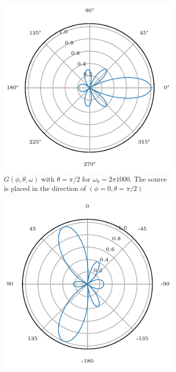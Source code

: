 \begin{figure}[h]
	\centering
	\begin{subfigure}[t]{0.45\textwidth}
		\centering
		\includegraphics[width=\textwidth]{radial_1200_circ_single.pdf}
		\caption{\(G(\phi, \theta, \omega)\) with $\theta = \pi/2$ for $\omega_0 = 2\pi 1000$.
		The source is placed in the direction of $(\phi=0, \theta = \pi/2)$}
		\label{ssl:fig:CircBmPhi}
	\end{subfigure}
	\hfill
	\begin{subfigure}[t]{0.45\textwidth}
		\centering
		\includegraphics[width=\textwidth]{radial_1200_circ_theta_single.pdf}

\end{subfigure}
\end{figure}
